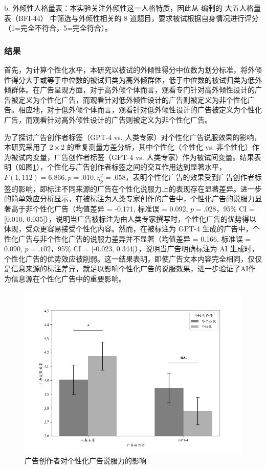 b. 外倾性人格量表：本实验关注外倾性这一人格特质，因此从 \citet{john1991big} 编制的 大五人格量表（BFI-44） 中筛选与外倾性相关的 8 道题目，要求被试根据自身情况进行评分（1=完全不符合，5=完全符合）。

\subsubsection{结果}
首先，为计算个性化水平，本研究以被试的外倾性得分中位数为划分标准，将外倾性得分大于或等于中位数的被试归类为高外倾群体，低于中位数的被试归类为低外倾群体。在广告呈现方面，对于高外倾个体而言，观看专门针对高外倾性设计的广告被定义为个性化广告，而观看针对低外倾性设计的广告则被定义为非个性化广告。相应地，对于低外倾个体而言，观看针对低外倾性设计的广告被定义为个性化广告，而观看针对高外倾性设计的广告则被定义为非个性化广告。

为了探讨广告创作者标签（GPT-4 vs. 人类专家）对个性化广告说服效果的影响，本研究采用了 $2 \times 2$ 的重复测量方差分析，其中个性化（个性化 vs. 非个性化）作为被试内变量，广告创作者标签（GPT-4 vs. 人类专家）作为被试间变量。结果表明（如图\ref{fig:Source_personalization}），个性化与广告创作者标签之间的交互作用达到显著水平，$\textit{F}(1,112) = 6.866, \textit{p} = .010, \eta_p^2 = .058$，表明个性化广告的效果受到广告创作者标签的影响，即标注不同来源的广告在个性化说服力上的表现存在显著差异。进一步的简单效应分析显示，在被标注为人类专家创作的广告中，个性化广告的说服力显著高于非个性化广告（均值差异 = -0.171, 标准误 = 0.092, $\textit{p} = .028$，95\% CI = [0.010, 0.035]），说明当广告被标注为由人类专家撰写时，个性化广告的优势得以体现，受众更容易接受个性化内容。然而，在被标注为 GPT-4 生成的广告中，个性化广告与非个性化广告的说服力差异并不显著（均值差异 = 0.166, 标准误 = 0.090, $\textit{p} = .102$，95\% CI = [-0.023, 0.344]），说明当广告明确标注为 AI 生成时，个性化广告的优势效应被削弱。这一结果表明，即使广告文本内容完全相同，仅仅是信息来源的标注差异，就足以影响个性化广告的说服效果，进一步验证了AI作为信息源在个性化广告中的重要影响。

\begin{figure}[H]
    \centering
    \includegraphics[width=1\linewidth]{Image/Study4-Source_Personalization.png}
    \caption{\label{fig:Source_personalization}广告创作者对个性化广告说服力的影响}
\end{figure}